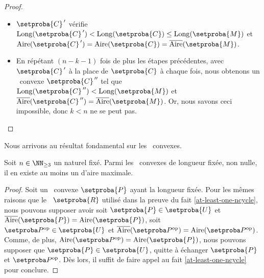 \begin{proof}
\begin{itemize}
		\item $\primeit{\setproba{C}}$ vérifie
		$\cyclelen{\primeit{\setproba{C}}} < \cyclelen{\setproba{C}} \leq \cyclelen{\setproba{M}}$
		et
		$\area{\primeit{\setproba{C}}} = \area{\setproba{C}} = \sarea{\setproba{M}}$.


		\item En répétant $(n - k - 1)$ fois de plus les étapes précédentes, avec $\primeit{\setproba{C}}$ à la place de $\setproba{C}$ à chaque fois,
		nous obtenons un \ngone\ convexe $\dbleprimeit{\setproba{C}}$
		tel que
		$\cyclelen{\dbleprimeit{\setproba{C}}} < \cyclelen{\setproba{M}}$
		et
		$\sarea{\dbleprimeit{\setproba{C}}} = \sarea{\setproba{M}}$.
		Or, nous savons ceci impossible, donc $k < n$ ne se peut pas.
    \end{itemize}

	\null\vspace{-6ex}
\end{proof}




Nous arrivons au résultat fondamental sur les \ngones\ convexes.


\begin{fact} \label{at-least-one-ngone-convex}
    Soit $n \in \NN_{\geq3}$ un naturel fixé.
    Parmi les \ngones\ convexes de longueur fixée, non nulle, il en existe au moins un d'aire maximale.
\end{fact}


\begin{proof}
    Soit un \ngone\ convexe $\setproba{P}$ ayant la longueur fixée. 
    Pour les mêmes raisons que le \nreg\ $\setproba{R}$ utilisé dans la preuve du fait \ref{at-least-one-ncycle},
	nous pouvons supposer avoir
	soit $\setproba{P} \in \setproba{U}$ et $\sarea{\setproba{P}} = \area{\setproba{P}}$,
	soit $\cycleop{P} \in \setproba{U}$ et $\sarea{\cycleop{P}} = \area{\cycleop{P}}$.
	Comme, de plus, $\area{\cycleop{P}} = \area{\setproba{P}}$,
	nous pouvons supposer que $\setproba{P} \in \setproba{U}$,
	quitte à échanger $\setproba{P}$ et $\cycleop{P}$.
    Dès lors, il suffit de faire appel au fait \ref{at-least-one-ncycle} pour conclure.    
\end{proof}
